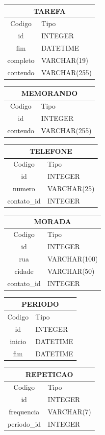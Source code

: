 \documentclass[a4paper,12pt]{article}
\begin{document}
\begin{multicols}{2}
		\begin{tabular}{|c|l|} \hline
			\multicolumn{2}{|c|}{TAREFA} \\ \hline
			Codigo & Tipo \\ \hline
			id & INTEGER \\
			fim & DATETIME \\ 
			completo & VARCHAR(19) \\
			conteudo & VARCHAR(255) \\ \hline
		\end{tabular}

		\begin{tabular}{|c|l|} \hline
			\multicolumn{2}{|c|}{MEMORANDO} \\ \hline
			Codigo & Tipo \\ \hline
			id & INTEGER \\
			conteudo & VARCHAR(255) \\ \hline
		\end{tabular}

		\begin{tabular}{|c|l|} \hline
			\multicolumn{2}{|c|}{TELEFONE} \\ \hline
			Codigo & Tipo \\ \hline
			id & INTEGER \\
			numero & VARCHAR(25) \\
			contato\_id & INTEGER \\ \hline
		\end{tabular}
		
		\begin{tabular}{|c|l|} \hline
			\multicolumn{2}{|c|}{MORADA} \\ \hline
			Codigo & Tipo \\ \hline
			id & INTEGER \\
			rua & VARCHAR(100) \\
			cidade & VARCHAR(50) \\
			contato\_id & INTEGER \\ \hline
		\end{tabular}

		\begin{tabular}{|c|l|} \hline
			\multicolumn{2}{|c|}{PERIODO} \\ \hline
			Codigo & Tipo \\ \hline
			id & INTEGER \\
			inicio & DATETIME \\
			fim & DATETIME \\ \hline
		\end{tabular}
		
		\begin{tabular}{|c|l|} \hline
			\multicolumn{2}{|c|}{REPETICAO} \\ \hline
			Codigo & Tipo \\ \hline
			id & INTEGER \\
			frequencia & VARCHAR(7) \\
			periodo\_id & INTEGER \\ \hline
		\end{tabular}

	\end{multicols}
\end{document}
